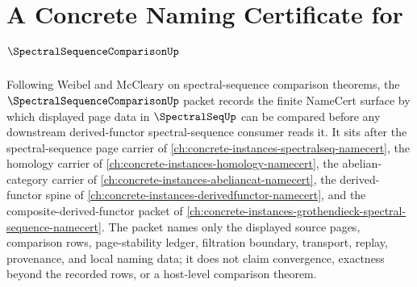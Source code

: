 \chapter{A Concrete Naming Certificate for $\SpectralSequenceComparisonUp$}
\label{ch:concrete-instances-spectral-sequence-comparison-namecert}

Following Weibel and McCleary on spectral-sequence comparison theorems, the $\SpectralSequenceComparisonUp$ packet records the finite NameCert surface by which displayed page data in $\SpectralSeqUp$ can be compared before any downstream derived-functor spectral-sequence consumer reads it. It sits after the spectral-sequence page carrier of \autoref{ch:concrete-instances-spectralseq-namecert}, the homology carrier of \autoref{ch:concrete-instances-homology-namecert}, the abelian-category carrier of \autoref{ch:concrete-instances-abeliancat-namecert}, the derived-functor spine of \autoref{ch:concrete-instances-derivedfunctor-namecert}, and the composite-derived-functor packet of \autoref{ch:concrete-instances-grothendieck-spectral-sequence-namecert}. The packet names only the displayed source pages, comparison rows, page-stability ledger, filtration boundary, transport, replay, provenance, and local naming data; it does not claim convergence, exactness beyond the recorded rows, or a host-level comparison theorem.

